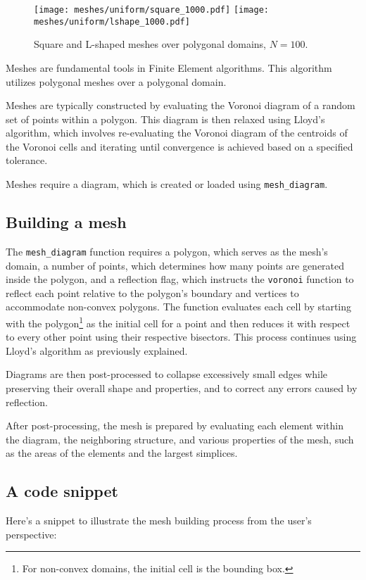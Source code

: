 \begin{figure}[!ht]
	\centering
	\texttt{[image: meshes/uniform/square\_1000.pdf]}
    \texttt{[image: meshes/uniform/lshape\_1000.pdf]}
	\caption{Square and L-shaped meshes over polygonal domains, $N = 100$.}
\end{figure}

Meshes are fundamental tools in Finite Element algorithms. This algorithm utilizes polygonal meshes over a polygonal domain.

\cite{Talischi2012} Meshes are typically constructed by evaluating the Voronoi diagram of a random set of points within a polygon. This diagram is then relaxed using Lloyd's algorithm, which involves re-evaluating the Voronoi diagram of the centroids of the Voronoi cells and iterating until convergence is achieved based on a specified tolerance.

Meshes require a diagram, which is created or loaded using \lstinline{mesh_diagram}.

\subsection{Building a mesh}

The \lstinline{mesh_diagram} function requires a polygon, which serves as the mesh's domain, a number of points, which determines how many points are generated inside the polygon, and a reflection flag, which instructs the \lstinline{voronoi} function to reflect each point relative to the polygon's boundary and vertices to accommodate non-convex polygons. The function evaluates each cell by starting with the polygon\footnote{For non-convex domains, the initial cell is the bounding box.} as the initial cell for a point and then reduces it with respect to every other point using their respective bisectors. This process continues using Lloyd's algorithm as previously explained.

Diagrams are then post-processed to collapse excessively small edges while preserving their overall shape and properties, and to correct any errors caused by reflection.

After post-processing, the mesh is prepared by evaluating each element within the diagram, the neighboring structure, and various properties of the mesh, such as the areas of the elements and the largest simplices.

\newpage
\subsection{A code snippet}

Here's a snippet to illustrate the mesh building process from the user's perspective:

